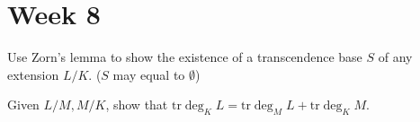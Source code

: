 
\section{Week 8}

\begin{exercise} 
  Use Zorn's lemma to show the existence of a transcendence base $S$ of any 
  extension $L/K$. ($S$ may equal to $\emptyset$)
\end{exercise}

\begin{exercise}
  Given $L/M, M/K$, show that $\mathrm{tr} \deg_K L = \mathrm{tr} \deg_M L
  + \mathrm{tr} \deg_K M$.
\end{exercise}

